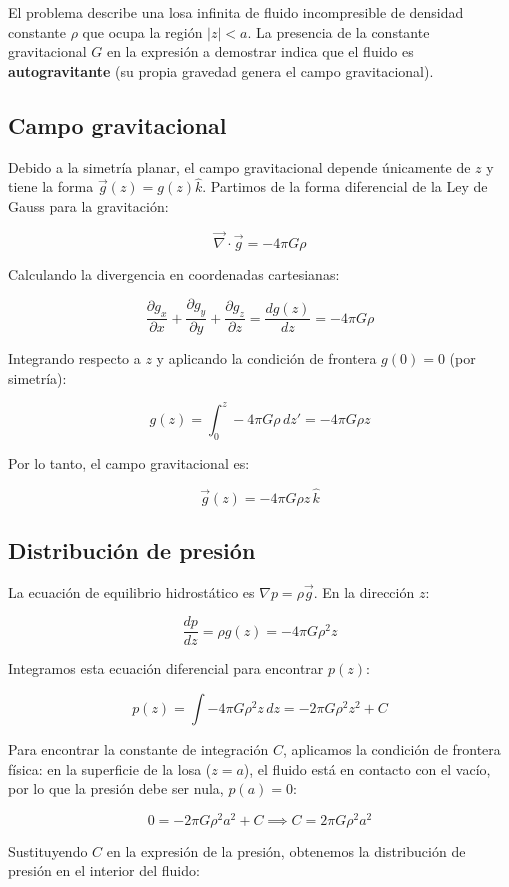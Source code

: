 \documentclass{article}
\begin{document}
El problema describe una losa infinita de fluido incompresible de densidad constante $\rho$ que ocupa la región $|z| < a$. La presencia de la constante gravitacional $G$ en la expresión a demostrar indica que el fluido es \textbf{autogravitante} (su propia gravedad genera el campo gravitacional).

\subsection{Campo gravitacional}

Debido a la simetría planar, el campo gravitacional depende únicamente de $z$ y tiene la forma $\vec{g}(z) = g(z) \hat{k}$. Partimos de la forma diferencial de la Ley de Gauss para la gravitación:

$$ \vec{\nabla} \cdot \vec{g} = -4\pi G \rho $$

Calculando la divergencia en coordenadas cartesianas:

$$ \frac{\partial g_x}{\partial x} + \frac{\partial g_y}{\partial y} + \frac{\partial g_z}{\partial z} = \frac{d g(z)}{dz} = -4\pi G \rho $$

Integrando respecto a $z$ y aplicando la condición de frontera $g(0)=0$ (por simetría):

$$ g(z) = \int_0^z -4\pi G \rho \, dz' = -4\pi G \rho z $$

Por lo tanto, el campo gravitacional es:

$$ \vec{g}(z) = -4\pi G \rho z \, \hat{k} $$
\subsection{Distribución de presión}

La ecuación de equilibrio hidrostático es $\nabla p = \rho \vec{g}$. En la dirección $z$:

$$ \frac{dp}{dz} = \rho g(z) = -4\pi G \rho^2 z $$

Integramos esta ecuación diferencial para encontrar $p(z)$:

$$ p(z) = \int -4\pi G \rho^2 z \, dz = -2\pi G \rho^2 z^2 + C $$

Para encontrar la constante de integración $C$, aplicamos la condición de frontera física: en la superficie de la losa ($z = a$), el fluido está en contacto con el vacío, por lo que la presión debe ser nula, $p(a) = 0$:

$$ 0 = -2\pi G \rho^2 a^2 + C \implies C = 2\pi G \rho^2 a^2 $$

Sustituyendo $C$ en la expresión de la presión, obtenemos la distribución de presión en el interior del fluido:
\end{document}
